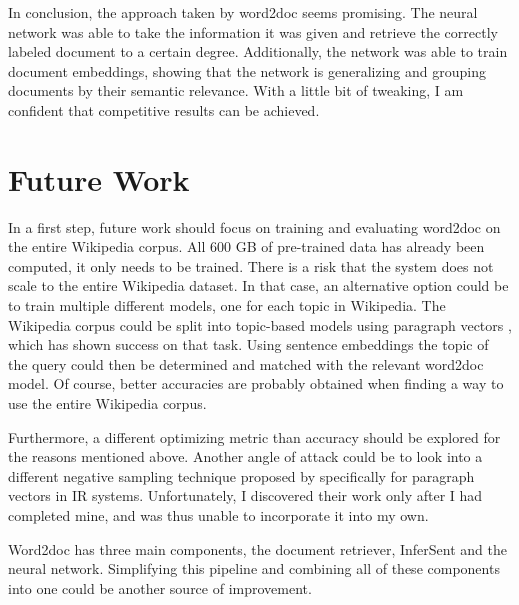 In conclusion, the approach taken by word2doc seems promising. The neural network was able to take the information it
was given and retrieve the correctly labeled document to a certain degree. Additionally, the network was able to train document
embeddings, showing that the network is generalizing and grouping documents by their semantic relevance. With a little bit of
tweaking, I am confident that competitive results can be achieved.


\section{Future Work}

In a first step, future work should focus on training and evaluating word2doc on the entire Wikipedia corpus. All 600 GB of
pre-trained data has already been computed, it only needs to be trained. There is a risk that the system does not scale to the
entire Wikipedia dataset. In that case, an alternative option could be to train multiple different models, one for each topic in
Wikipedia. The Wikipedia corpus could be split into topic-based models using paragraph vectors \citep{doc2vec}, which has
shown success on that task. Using sentence embeddings the topic of the query could then be determined and matched with the relevant
word2doc model. Of course, better accuracies are probably obtained when finding a way to use the entire Wikipedia corpus.

Furthermore, a different optimizing metric than accuracy should be explored for the reasons mentioned above. Another angle of
attack could be to look into a different negative sampling technique proposed by \citet{ai2016} specifically for paragraph vectors
\citep{doc2vec} in IR systems. Unfortunately, I discovered their work only after I had completed mine, and was thus unable to incorporate it
into my own.

Word2doc has three main components, the document retriever, InferSent and the neural network. Simplifying this pipeline and combining
all of these components into one could be another source of improvement.


